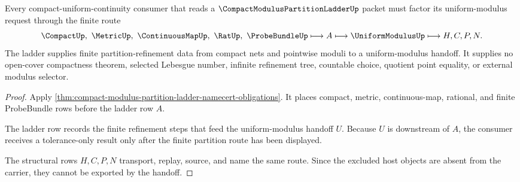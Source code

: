 \begin{theorem}
\label{thm:compact-modulus-partition-ladder-handoff}
Every compact-uniform-continuity consumer that reads a $\CompactModulusPartitionLadderUp$ packet must factor its uniform-modulus request through the finite route
$$
\CompactUp,\ \MetricUp,\ \ContinuousMapUp,\ \RatUp,\ \ProbeBundleUp
\longmapsto
A
\longmapsto
\UniformModulusUp
\longmapsto
H,C,P,N .
$$
The ladder supplies finite partition-refinement data from compact nets and pointwise moduli to a uniform-modulus handoff. It supplies no open-cover compactness theorem, selected Lebesgue number, infinite refinement tree, countable choice, quotient point equality, or external modulus selector.
\end{theorem}
\begin{proof}
Apply \autoref{thm:compact-modulus-partition-ladder-namecert-obligations}. It places compact, metric, continuous-map, rational, and finite ProbeBundle rows before the ladder row $A$.

The ladder row records the finite refinement steps that feed the uniform-modulus handoff $U$. Because $U$ is downstream of $A$, the consumer receives a tolerance-only result only after the finite partition route has been displayed.

The structural rows $H,C,P,N$ transport, replay, source, and name the same route. Since the excluded host objects are absent from the carrier, they cannot be exported by the handoff.
\end{proof}




